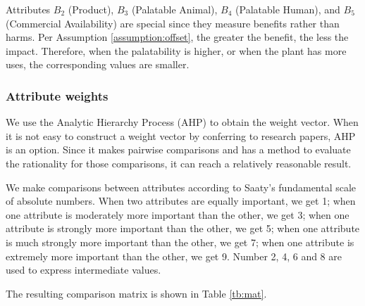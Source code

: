 \documentclass[12pt]{article}
\begin{document}
		Attributes $B_2$ (Product), $B_3$ (Palatable Animal), $B_4$ (Palatable Human), and $B_5$ (Commercial Availability) are special since they measure benefits rather than harms.  Per Assumption \ref{assumption:offset}, the greater the benefit, the less the impact.  Therefore, when the palatability is higher, or when the plant has more uses, the corresponding values are smaller.
		
		\subsubsection{Attribute weights}
		\label{sec:attr_weight}
		
		We use the Analytic Hierarchy Process (AHP) to obtain the weight vector.  When it is not easy to construct a weight vector by conferring to research papers, AHP is an option.  Since it makes pairwise comparisons and has a method to evaluate the rationality for those comparisons, it can reach a relatively reasonable result.
		
		We make comparisons between attributes according to Saaty's fundamental scale of absolute numbers\autocite{AHP}.  When two attributes are equally important, we get 1; when one attribute is moderately more important than the other, we get 3; when one attribute is strongly more important than the other, we get 5; when one attribute is much strongly more important than the other, we get 7; when one attribute is extremely more important than the other, we get 9.  Number 2, 4, 6 and 8 are used to express intermediate values.  
		
		The resulting comparison matrix is shown in Table \ref{tb:mat}.
		
\end{document}
